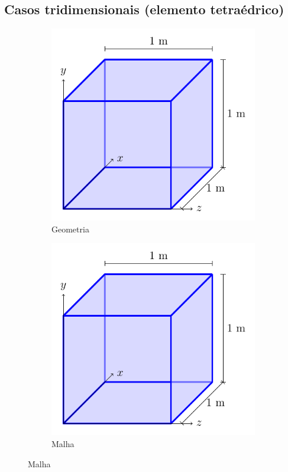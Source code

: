 \subsection{Casos tridimensionais (elemento tetraédrico)}

\begin{figure}
    \centering
    \caption{O cubo unitário.}
    \begin{subfigure}[b]{0.45\textwidth}
        \centering
        \includegraphics[page=1]{Figuras/verificacao_cubo.pdf}
        \caption{Geometria}
        \label{fig:verificacao_cubo_1}
    \end{subfigure}
    \begin{subfigure}[b]{0.45\textwidth}
        \centering
        \includegraphics[page=2]{Figuras/verificacao_cubo.pdf}
        \caption{Malha}
        \label{fig:verificacao_cubo_2}
    \end{subfigure}
\end{figure}

